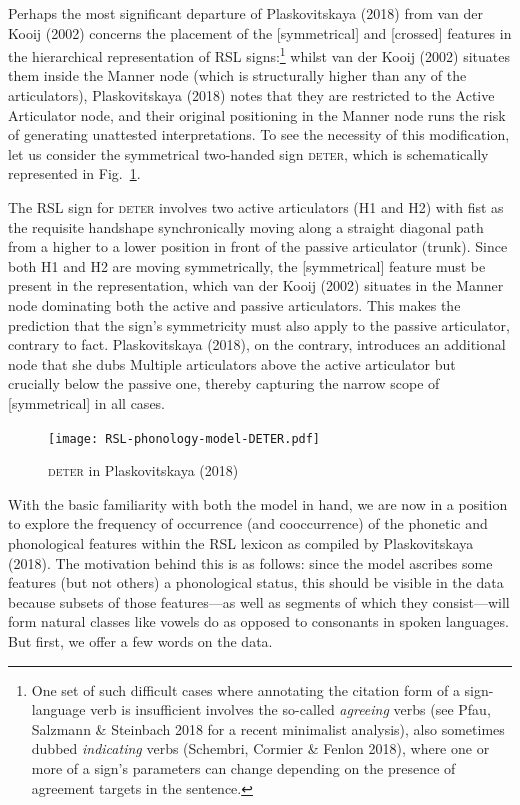 Perhaps the most significant departure of Plaskovitskaya (2018) from van
der Kooij (2002) concerns the placement of the {[}symmetrical{]} and
{[}crossed{]} features in the hierarchical representation of RSL
signs:\footnote{One set of such difficult cases where annotating the
  citation form of a sign-language verb is insufficient involves the
  so-called \emph{agreeing} verbs (see Pfau, Salzmann \& Steinbach 2018
  for a recent minimalist analysis), also sometimes dubbed
  \emph{indicating} verbs (Schembri, Cormier \& Fenlon 2018), where one
  or more of a sign's parameters can change depending on the presence of
  agreement targets in the sentence.} whilst van der Kooij (2002)
situates them inside the Manner node (which is structurally higher than
any of the articulators), Plaskovitskaya (2018) notes that they are
restricted to the Active Articulator node, and their original
positioning in the Manner node runs the risk of generating unattested
interpretations. To see the necessity of this modification, let us
consider the symmetrical two-handed sign \textsc{deter}, which is
schematically represented in Fig.~\ref{fig:deter}.

The RSL sign for \textsc{deter} involves two active articulators (H1 and
H2) with \textsf{fist} as the requisite handshape synchronically moving
along a straight diagonal path from a higher to a lower position in
front of the passive articulator (trunk). Since both H1 and H2 are
moving symmetrically, the {[}symmetrical{]} feature must be present in
the representation, which van der Kooij (2002) situates in the Manner
node dominating both the active and passive articulators. This makes the
prediction that the sign's symmetricity must also apply to the passive
articulator, contrary to fact. Plaskovitskaya (2018), on the contrary,
introduces an additional node that she dubs Multiple articulators above
the active articulator but crucially below the passive one, thereby
capturing the narrow scope of {[}symmetrical{]} in all cases.

\begin{figure}
\hypertarget{fig:deter}{%
\centering
\texttt{[image: RSL-phonology-model-DETER.pdf]}
\caption{\textsc{deter} in Plaskovitskaya (2018)}\label{fig:deter}
}
\end{figure}

With the basic familiarity with both the model in hand, we are now in a
position to explore the frequency of occurrence (and cooccurrence) of
the phonetic and phonological features within the RSL lexicon as
compiled by Plaskovitskaya (2018). The motivation behind this is as
follows: since the model ascribes some features (but not others) a
phonological status, this should be visible in the data because subsets
of those features---as well as segments of which they consist---will
form natural classes like vowels do as opposed to consonants in spoken
languages. But first, we offer a few words on the data.

